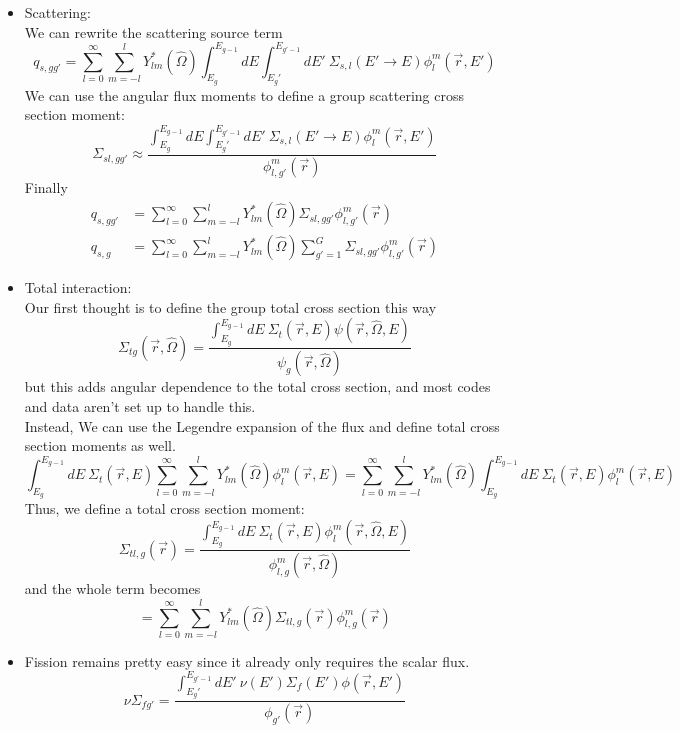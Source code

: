 \documentclass[12pt]{article}
\newcommand{\vOmega}{\ensuremath{\hat{\Omega}}}
\begin{document}
\begin{itemize}
\item Scattering:\\
We can rewrite the scattering source term
\[
q_{s,gg'} = \sum_{l=0}^{\infty} \sum_{m=-l}^l Y^*_{lm}(\vOmega)\int_{E_g}^{E_{g-1}} dE \int_{E_g'}^{E_{g'-1}} dE' \: \Sigma_{s,l}(E'\rightarrow E)\phi_{l}^{m}(\vec{r},E')
\]
We can use the angular flux moments to define a group scattering cross section moment:
\[
\Sigma_{sl,gg'} \approx \dfrac{\int_{E_g}^{E_{g-1}} dE \int_{E_g'}^{E_{g'-1}} dE' \: \Sigma_{s,l}(E'\rightarrow E)\phi_{l}^{m}(\vec{r},E')}{\phi_{l,g'}^{m}(\vec{r})}
\]
Finally
\begin{align*}
q_{s,gg'} &= \sum_{l=0}^{\infty} \sum_{m=-l}^l Y^*_{lm}(\vOmega)\Sigma_{sl,gg'}\phi_{l,g'}^{m}(\vec{r})\\
q_{s,g} &= \sum_{l=0}^{\infty} \sum_{m=-l}^l Y^*_{lm}(\vOmega)\sum_{g'=1}^G \Sigma_{sl,gg'}\phi_{l,g'}^{m}(\vec{r})
\end{align*}

\item Total interaction:\\
Our first thought is to define the group total cross section this way
\[
\Sigma_{tg}(\vec{r}, \vOmega) = \dfrac{\int_{E_g}^{E_{g-1}} dE\: \Sigma_t(\vec{r}, E) \psi(\vec{r}, \vOmega, E)}{\psi_g(\vec{r}, \vOmega)}
\]
but this adds angular dependence to the total cross section, and most codes and data aren't set up to handle this. \\
Instead, We can use the Legendre expansion of the flux and define total cross section moments as well.
\[
\int_{E_g}^{E_{g-1}} dE\: \Sigma_t(\vec{r}, E)\sum_{l=0}^{\infty} \sum_{m=-l}^l Y^*_{lm}(\vOmega)\phi_{l}^{m}(\vec{r},E) = \sum_{l=0}^{\infty} \sum_{m=-l}^l Y^*_{lm}(\vOmega)\int_{E_g}^{E_{g-1}} dE\: \Sigma_{t}(\vec{r},E)\phi_{l}^{m}(\vec{r},E)
\]
Thus, we define a total cross section moment:
\[
\Sigma_{tl,g}(\vec{r}) = \dfrac{\int_{E_g}^{E_{g-1}} dE\: \Sigma_t(\vec{r}, E) \phi_l^m(\vec{r}, \vOmega, E)}{\phi_{l,g}^m(\vec{r}, \vOmega)}
\]
and the whole term becomes
\[
= \sum_{l=0}^{\infty} \sum_{m=-l}^l Y^*_{lm}(\vOmega)\Sigma_{tl,g}(\vec{r})\phi_{l,g}^{m}(\vec{r})
\]


\item Fission remains pretty easy since it already only requires the scalar flux. 
\[
\nu\Sigma_{fg'} = \dfrac{\int_{E_g'}^{E_{g'-1}} dE'\: \nu(E') \Sigma_f(E')\phi(\vec{r}, E')}{\phi_{g'}(\vec{r})}
\]

\end{itemize}
\end{document}
